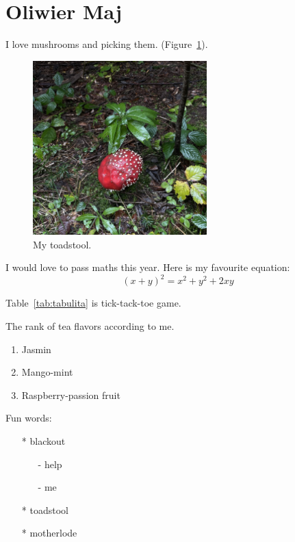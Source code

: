 \section{Oliwier Maj}

I love mushrooms and picking them. (Figure~\ref{fig:grzyb}).

\begin{figure}[htbp]
    \centering
    \includegraphics[width=0.6\textwidth]{Pictures/grzyb.jpeg}
    \caption{My toadstool.}
    \label{fig:grzyb}
\end{figure}

I would love to pass maths this year. Here is my favourite equation:\[(x+y)^2=x^2+y^2+2xy\]

\vspace{5.0cm}

Table~\ref{tab:tabulita} is tick-tack-toe game.\par


\vspace{1.0cm}

The rank of tea flavors according to me.
\begin{enumerate}
    \item Jasmin
    \item Mango-mint
    \item Raspberry-passion fruit
\end{enumerate}
\vspace{0.5cm}

Fun words:
\begin{itemize}
    \item[*] blackout
    \begin{itemize}
        \item [-] help 
        \item [-] me
    \end{itemize}
    \item[*] toadstool
    \item[*] motherlode
\end{itemize}

